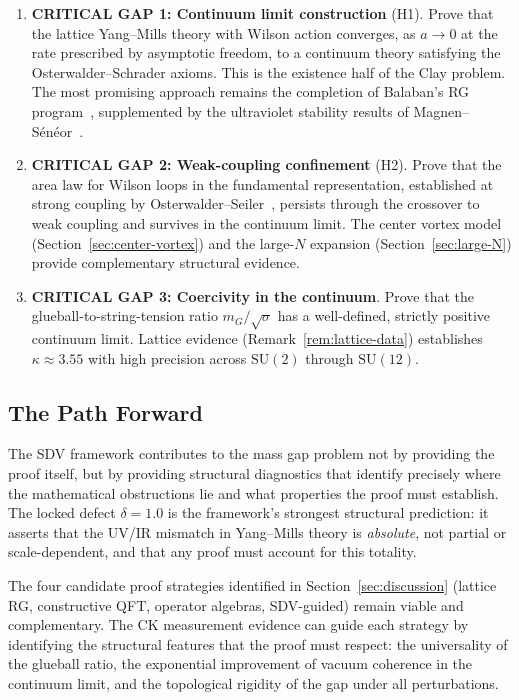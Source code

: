 \documentclass[11pt]{article}
\begin{document}
\begin{enumerate}
  \item \textbf{CRITICAL GAP 1: Continuum limit construction} (H1).
    Prove that the lattice Yang--Mills theory with Wilson action
    converges, as $a \to 0$ at the rate prescribed by asymptotic freedom,
    to a continuum theory satisfying the Osterwalder--Schrader axioms.
    This is the existence half of the Clay problem.  The most promising
    approach remains the completion of Balaban's RG
    program~\cite{Balaban}, supplemented by the ultraviolet stability
    results of Magnen--S\'en\'eor~\cite{MagSen}.

  \item \textbf{CRITICAL GAP 2: Weak-coupling confinement} (H2).
    Prove that the area law for Wilson loops in the fundamental
    representation, established at strong coupling by
    Osterwalder--Seiler~\cite{OS}, persists through the crossover to
    weak coupling and survives in the continuum limit.  The center
    vortex model (Section~\ref{sec:center-vortex}) and the large-$N$
    expansion (Section~\ref{sec:large-N}) provide complementary
    structural evidence.

  \item \textbf{CRITICAL GAP 3: Coercivity in the continuum}.
    Prove that the glueball-to-string-tension ratio
    $m_G/\sqrt{\sigma}$ has a well-defined, strictly positive continuum
    limit.  Lattice evidence (Remark~\ref{rem:lattice-data}) establishes
    $\kappa \approx 3.55$ with high precision across $\mathrm{SU}(2)$
    through $\mathrm{SU}(12)$.
\end{enumerate}

\subsection{The Path Forward}

The SDV framework contributes to the mass gap problem not by providing
the proof itself, but by providing structural diagnostics that identify
precisely where the mathematical obstructions lie and what properties
the proof must establish.  The locked defect $\delta = 1.0$ is the
framework's strongest structural prediction: it asserts that the UV/IR
mismatch in Yang--Mills theory is \emph{absolute}, not partial or
scale-dependent, and that any proof must account for this totality.

The four candidate proof strategies identified in
Section~\ref{sec:discussion} (lattice RG, constructive QFT, operator
algebras, SDV-guided) remain viable and complementary.  The CK
measurement evidence can guide each strategy by identifying the
structural features that the proof must respect: the universality of
the glueball ratio, the exponential improvement of vacuum coherence
in the continuum limit, and the topological rigidity of the gap under
all perturbations.
\end{document}

